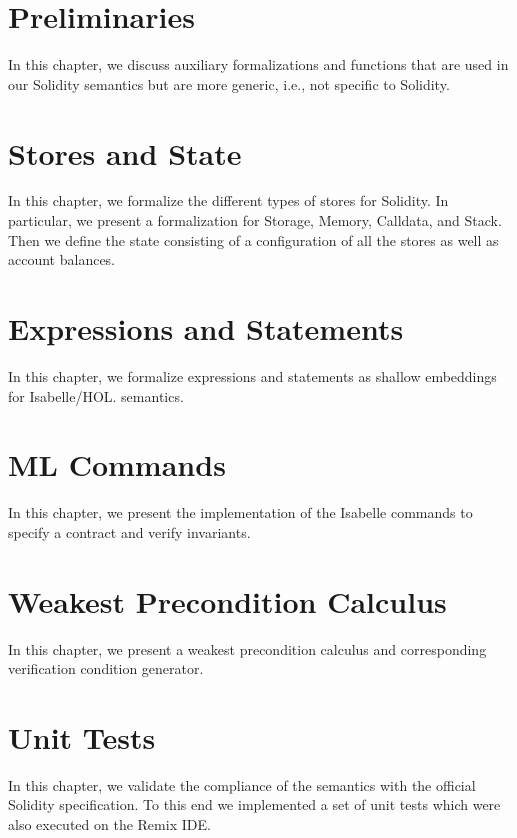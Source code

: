 \documentclass[10pt,DIV17,a4paper,abstract=true,twoside=semi,openright]
{scrreprt}
\begin{document}
\clearpage

\chapter{Preliminaries}
In this chapter, we discuss auxiliary formalizations and functions that
are used in our Solidity semantics but are more generic, i.e., not
specific to Solidity.




\chapter{Stores and State}
In this chapter, we formalize the different types of stores for Solidity.
In particular, we present a formalization for Storage, Memory, Calldata, and Stack.
Then we define the state consisting of a configuration of all the stores as well as account balances.





\chapter{Expressions and Statements}

In this chapter, we formalize expressions and statements as shallow embeddings for Isabelle/HOL.
semantics. 



\chapter{ML Commands}
In this chapter, we present the implementation of the Isabelle commands to specify
a contract and verify invariants.



\chapter{Weakest Precondition Calculus}
In this chapter, we present a weakest precondition calculus and corresponding
verification condition generator.



\chapter{Unit Tests}

In this chapter, we validate the compliance of the semantics with the official Solidity specification.
To this end we implemented a set of unit tests which were also executed on the Remix IDE.
\end{document}
